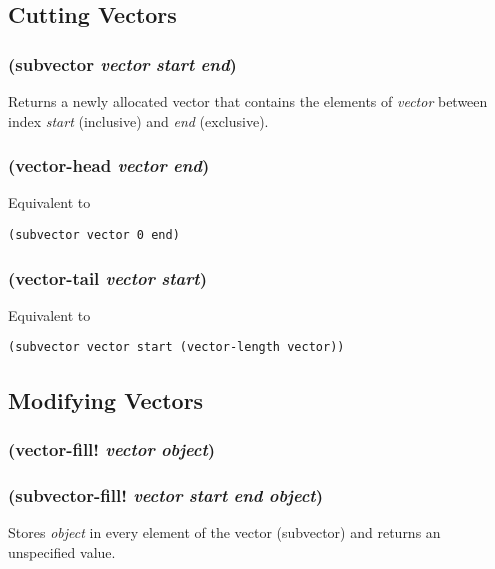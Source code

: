 \documentclass{article}
\begin{document}
\subsection{Cutting Vectors}\label{sec:cutting-vectors}

\subsubsection{(subvector \emph{vector} \emph{start} \emph{end})}

Returns a newly allocated vector that contains the elements of \emph{vector} between index
\emph{start} (inclusive) and \emph{end} (exclusive).

\subsubsection{(vector-head \emph{vector} \emph{end})}

Equivalent to

\begin{verbatim}
(subvector vector 0 end)
\end{verbatim}

\subsubsection{(vector-tail \emph{vector} \emph{start})}

Equivalent to

\begin{verbatim}
(subvector vector start (vector-length vector))
\end{verbatim}

\subsection{Modifying Vectors}\label{sec:modifying-vectors}

\subsubsection{(vector-fill! \emph{vector} \emph{object})}

\subsubsection{(subvector-fill! \emph{vector} \emph{start} \emph{end} \emph{object})}

Stores \emph{object} in every element of the vector (subvector) and returns an unspecified
value.
\end{document}
